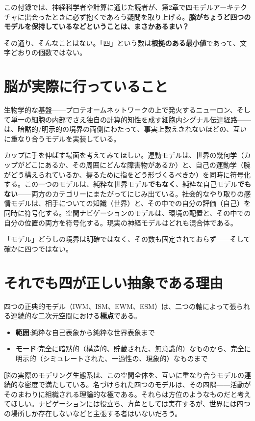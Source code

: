 \documentclass[11pt, twoside, openright]{book}
\begin{document}
この付録では、神経科学者や計算に通じた読者が、第2章で四モデルアーキテクチャに出会ったときに必ず抱くであろう疑問を取り上げる。\textbf{脳がちょうど四つのモデルを保持しているなどということは、まさかあるまい？}

その通り、そんなことはない。「四」という数は\textbf{根拠のある最小値}であって、文字どおりの個数ではない。

\section*{脳が実際に行っていること}

生物学的な基盤------プロテオームネットワークの上で発火するニューロン、そして単一の細胞の内部でさえ独自の計算的知性を成す細胞内シグナル伝達経路------は、暗黙的/明示的の境界の両側にわたって、事実上数えきれないほどの、互いに重なり合うモデルを実装している。

カップに手を伸ばす場面を考えてみてほしい。運動モデルは、世界の幾何学（カップがどこにあるか、その周囲にどんな障害物があるか）と、自己の運動学（腕がどう構えられているか、握るために指をどう形づくるべきか）を同時に符号化する。この一つのモデルは、純粋な世界モデル\textbf{でもなく}、純粋な自己モデル\textbf{でもない}------両方のカテゴリーにまたがってにじみ出ている。社会的なやり取りの感情モデルは、相手についての知識（世界）と、その中での自分の評価（自己）を同時に符号化する。空間ナビゲーションのモデルは、環境の配置と、その中での自分の位置の両方を符号化する。現実の神経モデルはどれも混合体である。

「モデル」どうしの境界は明確ではなく、その数も固定されておらず------そして確かに四つではない。

\section*{それでも四が正しい抽象である理由}

四つの正典的モデル（IWM、ISM、EWM、ESM）は、二つの軸によって張られる連続的な二次元空間における\textbf{極点}である。

\begin{itemize}
  \item \textbf{範囲}:純粋な自己表象から純粋な世界表象まで
  \item \textbf{モード}:完全に暗黙的（構造的、貯蔵された、無意識的）なものから、完全に明示的（シミュレートされた、一過性の、現象的）なものまで
\end{itemize}

脳の実際のモデリング生態系は、この空間全体を、互いに重なり合うモデルの連続的な密度で満たしている。名づけられた四つのモデルは、その四隅------活動がそのまわりに組織される理論的な極である。それらは方位のようなものだと考えてほしい。ナビゲーションには役立ち、方角としては実在するが、世界には四つの場所しか存在しないなどと主張する者はいないだろう。
\end{document}
